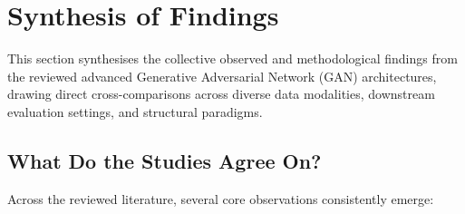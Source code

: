 \documentclass[12pt,a4paper]{article}
\begin{document}

\section{Synthesis of Findings}

This section synthesises the collective observed and methodological findings from the reviewed advanced Generative Adversarial Network (GAN) architectures, drawing direct cross-comparisons across diverse data modalities, downstream evaluation settings, and structural paradigms.

\subsection{What Do the Studies Agree On?}

Across the reviewed literature, several core observations consistently emerge:
\end{document}
